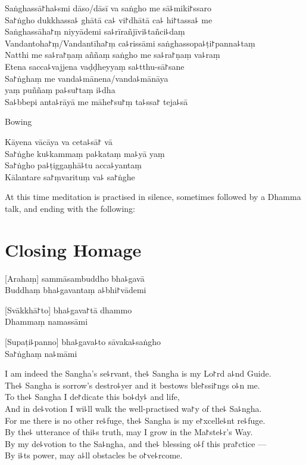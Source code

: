 \enlargethispage{\baselineskip}
\clearpage

Saṅghassā꜓ha꜕smi dāso/dāsī va saṅgho me sā꜕miki꜓ssaro\\%
Sa꜓ṅgho dukkhassa꜕ ghātā ca꜕ vi꜓dhātā ca꜕ hi꜓tassa꜕ me\\
Saṅghassāha꜓ṃ niyyādemi sa꜕rīrañjīvi꜕tañci꜕daṃ\\
Vandantoha꜓ṃ/Vandantīha꜓ṃ ca꜕rissāmi saṅghassopa꜕ṭi꜓panna꜕taṃ\\
Natthi me sa꜕ra꜓ṇaṃ aññaṃ saṅgho me sa꜕ra꜓ṇaṃ va꜕raṃ\\
Etena sacca꜕vajjena vaḍḍheyyaṃ sa꜕tthu-sā꜓sane\\
Sa꜓ṅghaṃ me vanda꜕mānena/vanda꜕mānāya\\
\vin yaṃ puññaṃ pa꜕su꜓taṃ i꜕dha\\
Sa꜕bbepi anta꜕rāyā me māhe꜓su꜓ṃ ta꜕ssa꜓ teja꜕sā

\begin{instruction}
  Bowing
\end{instruction}

Kāyena vācāya va ceta꜕sā꜓ vā\\
Sa꜓ṅghe ku꜕kammaṃ pa꜕kataṃ ma꜕yā yaṃ\\
Sa꜓ṅgho pa꜕ṭiggaṇhā꜕tu acca꜕yantaṃ\\
Kālantare sa꜓ṃvarituṃ va꜕ sa꜓ṅghe

\vfill

\begin{instruction}
  At this time meditation is practised in silence, sometimes followed by a Dhamma talk, and ending with the following:
\end{instruction}

\chPali
\chapter{Closing Homage}%

[Arahaṃ] sammāsambuddho bha꜕gavā\\
Buddhaṃ bha꜕gavantaṃ a꜕bhi꜓vādemi 

[Svākkhā꜓to] bha꜕gava꜓tā dhammo\\
Dhammaṃ namassāmi 

[Supaṭi꜕panno] bha꜕gava꜕to sāvaka꜕saṅgho\\
Sa꜓ṅghaṃ na꜕māmi 

\clearpage

I am indeed the Sangha's se꜕rvant, the꜕ Sangha is my Lo꜓rd a꜕nd Guide.\\%
The꜕ Sangha is sorrow's destro꜕yer and it bestows ble꜓ssi꜓ngs o꜕n me.\\
To the꜕ Sangha I de꜓dicate this bo꜕dy꜕ and life,\\
And in de꜕votion I wi꜕ll walk the well-practised wa꜓y of the꜕ Sa꜕ngha.\\
For me there is no other re꜕fuge, the꜕ Sangha is my e꜓xcelle꜕nt re꜕fuge.\\
By the꜕ utterance of thi꜕s truth, may I grow in the Ma꜓ste꜕r's Way.\\
By my de꜕votion to the Sa꜕ngha, and the꜕ blessing o꜕f this pra꜓ctice ---\\
By i꜕ts power, may a꜕ll obstacles be o꜓ve꜕rcome.

